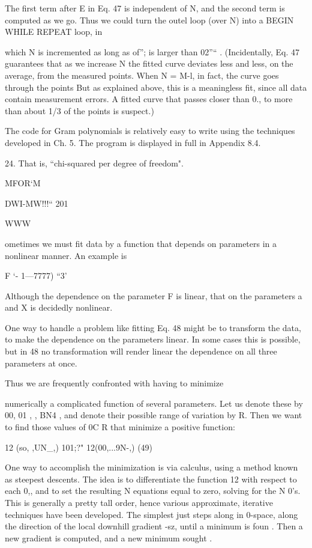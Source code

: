 {{{The ﬁrst term after E in Eq. 47 is independent of N, and the
second term is computed as we go. Thus we could turn the outel
loop (over N) into a BEGIN WHILE REPEAT loop, in

which N is incremented as long as of”; is larger than 02”“ .
(Incidentally, Eq. 47 guarantees that as we increase N the ﬁtted
curve deviates less and less, on the average, from the measured
points. When N = M-l, in fact, the curve goes through the points
But as explained above, this is a meaningless ﬁt, since all data
contain measurement errors. A ﬁtted curve that passes closer
than 0., to more than about 1/3 of the points is suspect.)

The code for Gram polynomials is relatively easy to write using
the techniques developed in Ch. 5. The program is displayed in
full in Appendix 8.4.

 

24. That is, “chi-squared per degree of freedom".

MFOR‘M

DWI-MW!!!“ 201

WWW

ometimes we must ﬁt data by a function that depends on
parameters in a nonlinear manner. An example is

F
‘- 1—7777) “3’

Although the dependence on the parameter F is linear, that on
the parameters a and X is decidedly nonlinear.

One way to handle a problem like ﬁtting Eq. 48 might be to
transform the data, to make the dependence on the parameters
linear. In some cases this is possible, but in 48 no transformation
will render linear the dependence on all three parameters at once.

Thus we are frequently confronted with having to minimize

numerically a complicated function of several parameters. Let
us denote these by 00, 01 , , BN4 , and denote their possible
range of variation by R. Then we want to ﬁnd those values of
{ 0}C R that minimize a positive function:

12 (so, ,UN_,) 101;?" 12(00,...9N-,) (49)

One way to accomplish the minimization is via calculus, using a
method known as steepest descents. The idea is to differentiate
the function 12 with respect to each 0,, and to set the resulting N
equations equal to zero, solving for the N 0’s. This is generally a
pretty tall order, hence various approximate, iterative techniques
have been developed. The simplest just steps along in 0-space,
along the direction of the local downhill gradient -sz, until a
minimum is foun . Then a new gradient is computed, and a new
minimum sought .

}}}
